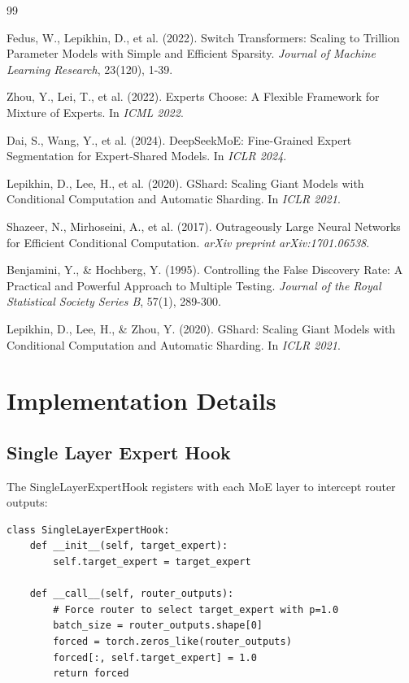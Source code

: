 \documentclass[11pt,a4paper]{article}
\begin{document}
\begin{thebibliography}{99}

 Fedus, W., Lepikhin, D., et al. (2022). Switch Transformers: Scaling to Trillion Parameter Models with Simple and Efficient Sparsity. \textit{Journal of Machine Learning Research}, 23(120), 1-39.

 Zhou, Y., Lei, T., et al. (2022). Experts Choose: A Flexible Framework for Mixture of Experts. In \textit{ICML 2022}.

 Dai, S., Wang, Y., et al. (2024). DeepSeekMoE: Fine-Grained Expert Segmentation for Expert-Shared Models. In \textit{ICLR 2024}.

 Lepikhin, D., Lee, H., et al. (2020). GShard: Scaling Giant Models with Conditional Computation and Automatic Sharding. In \textit{ICLR 2021}.

 Shazeer, N., Mirhoseini, A., et al. (2017). Outrageously Large Neural Networks for Efficient Conditional Computation. \textit{arXiv preprint arXiv:1701.06538}.

 Benjamini, Y., \& Hochberg, Y. (1995). Controlling the False Discovery Rate: A Practical and Powerful Approach to Multiple Testing. \textit{Journal of the Royal Statistical Society Series B}, 57(1), 289-300.

 Lepikhin, D., Lee, H., \& Zhou, Y. (2020). GShard: Scaling Giant Models with Conditional Computation and Automatic Sharding. In \textit{ICLR 2021}.

\end{thebibliography}

\appendix

\section{Implementation Details}

\subsection{Single Layer Expert Hook}

The SingleLayerExpertHook registers with each MoE layer to intercept router outputs:

\begin{verbatim}
class SingleLayerExpertHook:
    def __init__(self, target_expert):
        self.target_expert = target_expert

    def __call__(self, router_outputs):
        # Force router to select target_expert with p=1.0
        batch_size = router_outputs.shape[0]
        forced = torch.zeros_like(router_outputs)
        forced[:, self.target_expert] = 1.0
        return forced
\end{verbatim}
\end{document}
